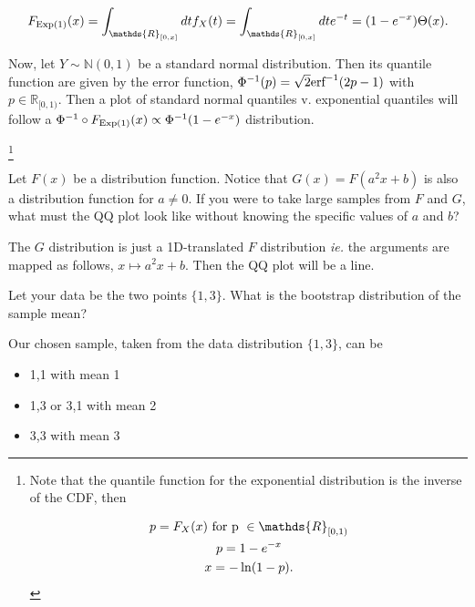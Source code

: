 \documentclass{homework}
\begin{document}
$$
F_{\textnormal{Exp}(1)}(x)= \int_{\mathds{R}_{[0,x]}} dt  f_{X}(t) = \int_{\mathds{R}_{[0,x]}} dt e^{-t} = (1-e^{-x})\Theta(x).
$$

Now, let $Y \sim \mathds{N}(0,1)$ be a standard normal distribution. Then its quantile function are given by the error function, $\Phi^{-1}(p) = \sqrt{2}\textnormal{erf}^{-1}(2p-1)$ with $p \in \mathds{R}_{[0,1)}$. Then a plot of standard normal quantiles v. exponential quantiles will follow a $\Phi^{-1} \circ F_{\textnormal{Exp}(1)}(x) \propto \Phi^{-1}(1-e^{-x})$ distribution.

\footnote{Note that the quantile function for the exponential distribution is the inverse of the CDF, then 

\begin{equation*}
    \begin{gathered}
        p = F_{X}(x) \textnormal{ for p } \in \mathds{R}_{[0,1)} \\ 
        p = 1-e^{-x} \\
        x = -\ln(1-p).
    \end{gathered}
\end{equation*}}

\begin{tcolorbox}[title=Question 10]
Let $F(x)$ be a distribution function. Notice that $G(x) = F(a^2x + b)$ is also a distribution function for $a \neq 0$. If you were to take large samples from $F$ and $G$, what must the QQ plot look like without knowing the specific values of $a$ and $b$?
\end{tcolorbox}

The $G$ distribution is just a 1D-translated $F$ distribution \textit{ie.} the arguments are mapped as follows, $x \mapsto a^2x+b$. Then the QQ plot will be a line. 

\begin{tcolorbox}[title=Question 11]
Let your data be the two points $\{1, 3\}$.  What is the bootstrap distribution of the sample mean?
\end{tcolorbox}

Our chosen sample, taken from the data distribution $\{1, 3\}$, can be 

\begin{itemize}
    \item {1,1} with mean 1
    \item {1,3} or {3,1} with mean 2
    \item {3,3} with mean 3
\end{itemize}
\end{document}

